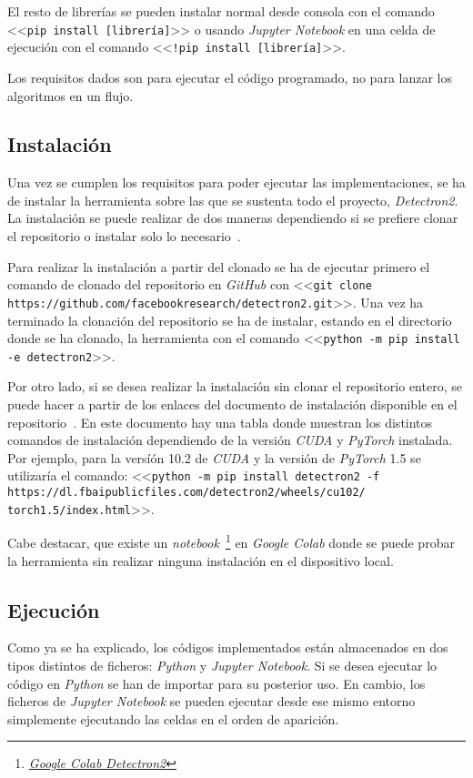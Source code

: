 El resto de librerías se pueden instalar normal desde consola con el comando <<\texttt{pip install [librería]}>> o usando \textit{Jupyter Notebook} en una celda de ejecución con el comando <<\texttt{!pip install [librería]}>>.

Los requisitos dados son para ejecutar el código programado, no para lanzar los algoritmos en un flujo.

\subsection{Instalación}
Una vez se cumplen los requisitos para poder ejecutar las implementaciones, se ha de instalar la herramienta sobre las que se sustenta todo el proyecto, \textit{Detectron2}. La instalación se puede realizar de dos maneras dependiendo si se prefiere clonar el repositorio o instalar solo lo necesario~\cite{inst}.

Para realizar la instalación a partir del clonado se ha de ejecutar primero el comando de clonado del repositorio en \textit{GitHub} con <<\texttt{git clone https://github.com/facebookresearch/detectron2.git}>>. Una vez ha terminado la clonación del repositorio se ha de instalar, estando en el directorio donde se ha clonado, la herramienta con el comando <<\texttt{python -m pip install -e detectron2}>>.

Por otro lado, si se desea realizar la instalación sin clonar el repositorio entero, se puede hacer a partir de los enlaces del documento de instalación disponible en el repositorio~\cite{inst}. En este documento hay una tabla donde muestran los distintos comandos de instalación dependiendo de la versión \textit{CUDA} y \textit{PyTorch} instalada. Por ejemplo, para la versíón 10.2 de \textit{CUDA} y la versión de \textit{PyTorch} 1.5 se utilizaría el comando: <<\texttt{python -m pip install detectron2 -f https://dl.fbaipublicfiles.com/detectron2/wheels/cu102/\\torch1.5/index.html}>>.

Cabe destacar, que existe un \textit{notebook}~\footnote{\href{https://colab.research.google.com/drive/16jcaJoc6bCFAQ96jDe2HwtXj7BMD_-m5}{\textit{Google Colab Detectron2}}} en \textit{Google Colab} donde se puede probar la herramienta sin realizar ninguna instalación en el dispositivo local.

\subsection{Ejecución}
Como ya se ha explicado, los códigos implementados están almacenados en dos tipos distintos de ficheros: \textit{Python} y \textit{Jupyter Notebook}. Si se desea ejecutar lo código en \textit{Python} se han de importar para su posterior uso. En cambio, los ficheros de \textit{Jupyter Notebook} se pueden ejecutar desde ese mismo entorno simplemente ejecutando las celdas en el orden de aparición.

